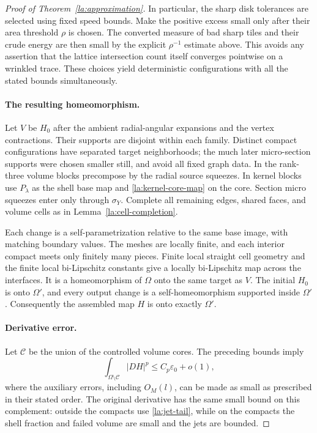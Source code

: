 \documentclass[11pt]{article}
\numberwithin{equation}{section}
\theoremstyle{definition}
\theoremstyle{remark}
\begin{document}
\begin{proof}[Proof of Theorem~\ref{la:approximation}]
In particular, the sharp disk tolerances are selected using fixed
speed bounds.  Make the positive excess small only after their area
threshold $\rho$ is chosen.  The converted measure of bad sharp
tiles and their crude energy are then small by the explicit
$\rho^{-1}$ estimate above.  This avoids any assertion that the
lattice intersection count itself converges pointwise on a
wrinkled trace.  These choices yield deterministic configurations
with all the stated bounds simultaneously.

\paragraph{The resulting homeomorphism.}
Let $V$ be $H_0$ after the ambient radial-angular expansions and the
vertex contractions.  Their supports are disjoint within each
family.  Distinct compact configurations have separated target
neighborhoods; the much later micro-section supports were chosen
smaller still, and avoid all fixed graph data.  In the rank-three
volume blocks precompose by the radial source squeezes.  In kernel
blocks use $P_\lambda$ as the shell base map and
\eqref{la:kernel-core-map} on the core.  Section micro squeezes enter
only through $\sigma_Y$.  Complete all remaining edges, shared faces,
and volume cells as in Lemma~\ref{la:cell-completion}.

Each change is a self-parametrization relative to the same base
image, with matching boundary values.  The meshes are locally finite,
and each interior compact meets only finitely many pieces.  Finite
local straight cell geometry and the finite local bi-Lipschitz
constants give a locally bi-Lipschitz map across the interfaces.
It is a homeomorphism of $\Omega$ onto the same target as $V$.
The initial $H_0$ is onto $\Omega'$, and every output change is a
self-homeomorphism supported inside $\Omega'$.  Consequently the
assembled map $H$ is onto exactly $\Omega'$.

\paragraph{Derivative error.}
Let $\mathcal C$ be the union of the controlled volume cores.  The
preceding bounds imply
\begin{equation}\label{la:outside-core-energy}
 \int_{\Omega\setminus\mathcal C}|DH|^p
       \le C_p\varepsilon_0+o(1),
\end{equation}
where the auxiliary errors, including $O_M(l)$, can be made as small
as prescribed in their stated order.  The original derivative has
the same small bound on this complement: outside the compacts use
\eqref{la:jet-tail}, while on the compacts the shell fraction and
failed volume are small and the jets are bounded.


\end{proof}
\end{document}
